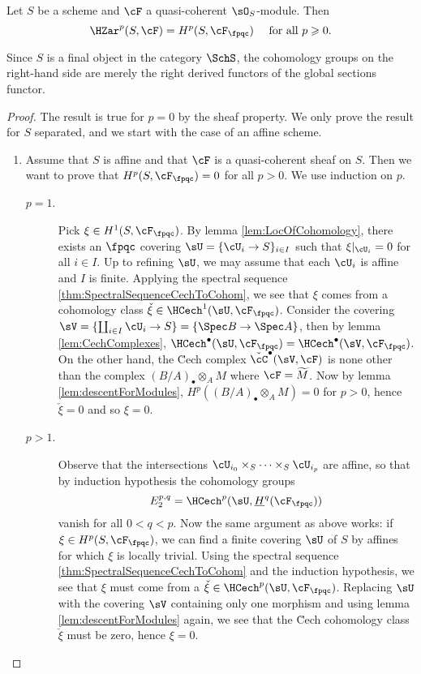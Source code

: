 \begin{thm} \label{thm:ZarIsFpqcForQCoh}
Let $S$ be a scheme and $\cF$ a quasi-coherent $\sO_S$-module. Then 
$$
\HZar^p(S, \cF) = H^p(S, \cF_\fpqc) \quad \text{ for all } p\geqslant 0.
$$
\end{thm}

\begin{remark}
Since $S$ is a final object in the category $\SchS$, the cohomology groups on the right-hand side are merely the right derived functors of the global sections functor.
\end{remark}

\begin{proof}
The result is true for $p=0$ by the sheaf property. We only prove the result for $S$ separated, and we start with the case of an affine scheme.
\begin{enumerate}[\it Step 1.]
\item
Assume that $S$ is affine and that $\cF$ is a quasi-coherent sheaf on $S$. Then we want to prove that $H^p(S, \cF_\fpqc) = 0$ for all $p>0$. We use induction on $p$.
\begin{description}
\item[$p=1$.]
Pick $\xi \in H^1(S, \cF_\fpqc)$. By lemma \ref{lem:LocOfCohomology}, there exists an $\fpqc$ covering $\sU = \{ \cU_i \to S \}_{i \in I}$ such that $\xi|_{\cU_i} = 0$ for all $i \in I$. Up to refining $\sU$, we may assume that each $\cU_i$ is affine and $I$ is finite. Applying the spectral sequence \ref{thm:SpectralSequenceCechToCohom}, we see that $\xi$ comes from a cohomology class $\check{\xi} \in \HCech^1(\sU, \cF_\fpqc)$. Consider the covering $\sV = \{ \coprod_{i\in I} \cU_i \to S\} = \{ \Spec B \to \Spec A \}$, then by lemma \ref{lem:CechComplexes}, $\HCech^\bullet(\sU, \cF_\fpqc) = \HCech^\bullet(\sV, \cF_\fpqc)$. On the other hand, the \u Cech complex $\check{\cC}^\bullet (\sV, \cF)$ is none other than the complex $(B/A)_\bullet \otimes_A M$ where $\cF = \widetilde{M}$. Now by lemma \ref{lem:descentForModules}, $H^p((B/A)_\bullet \otimes_A M) = 0$ for $p>0$, hence $\check{\xi} = 0$ and so $\xi = 0$.
\item[$p>1$.]
Observe that the intersections $\cU_{i_0} \times_S \cdots \times_S \cU_{i_p}$ are affine, so that by induction hypothesis the cohomology groups 
$$
E_2^{p,q} = \HCech^p(\sU, \underline{H}^q (\cF_\fpqc))
$$ 
vanish for all $0 < q < p$. Now the same argument as above works: if $\xi \in H^p(S, \cF_\fpqc)$, we can find a finite covering $\sU$ of $S$ by affines for which $\xi$ is locally trivial. Using the spectral sequence \ref{thm:SpectralSequenceCechToCohom} and the induction hypothesis, we see that $\xi$ must come from a $\check{\xi} \in \HCech^p(\sU, \cF_\fpqc)$. Replacing $\sU$ with the covering $\sV$ containing only one morphism and using lemma \ref{lem:descentForModules} again, we see that the \u Cech cohomology class $\check{\xi}$ must be zero, hence $\xi = 0$.

\end{description}
\end{enumerate}
\end{proof}
